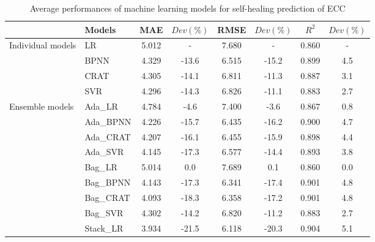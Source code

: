 \documentclass[11pt]{article}
\begin{document}
	\begin{table}[!h]
		\small
		\centering
		\caption{Average performances of machine learning models for self-healing prediction of ECC}
		\begin{tabular*}{0.75\textwidth}{ll|cc|cc|cc}
			\toprule
			&	Models	&	MAE	&	$Dev(\%)$	&	RMSE	&	$Dev(\%)$	&	$R^2$	&	$Dev(\%)$	\\
			\midrule
			\multirow{4}{0.55in}{Individual models} &	LR	&	5.012	&	-	&	7.680	&	-	&	0.860	&	-	\\
			
			&	BPNN	&	4.329	&	-13.6	&	6.515	&	-15.2	&	0.899	&	4.5	\\
			
			&	CRAT	&	4.305	&	-14.1	&	6.811	&	-11.3	&	0.887	&	3.1	\\
			
			&	SVR	&	4.296	&	-14.3	&	6.826	&	-11.1	&	0.883	&	2.7	\\
			
			\midrule
			\multirow{10}{0.55in}{Ensemble models} 	&	Ada\_LR	&	4.784	&	-4.6	&	7.400	&	-3.6	&	0.867	&	0.8	\\
			
			&	Ada\_BPNN	&	4.226	&	-15.7	&	6.435	&	-16.2	&	0.900	&	4.7	\\
			
			&	Ada\_CRAT	&	4.207	&	-16.1	&	6.455	&	-15.9	&	0.898	&	4.4	\\
			
			&	Ada\_SVR	&	4.145	&	-17.3	&	6.577	&	-14.4	&	0.893	&	3.8	\\
			
			&	Bag\_LR	&	5.014	&	0.0	&	7.689	&	0.1	&	0.860	&	0.0	\\
			
			&	Bag\_BPNN	&	4.143	&	-17.3	&	6.341	&	-17.4	&	0.901	&	4.8	\\
			
			&	Bag\_CRAT	&	4.093	&	-18.3	&	6.358	&	-17.2	&	0.901	&	4.8	\\
			
			&	Bag\_SVR	&	4.302	&	-14.2	&	6.820	&	-11.2	&	0.883	&	2.7	\\
			
			&	Stack\_LR	&	3.934	&	-21.5	&	6.118	&	-20.3	&	0.904	&	5.1	\\
			\bottomrule
		\end{tabular*}
		\label{per}
	\end{table} 
\end{document}
